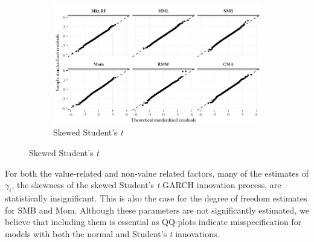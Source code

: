 \begin{figure}[!pt]
\begin{subfigure}{0.70\textwidth}
    \includegraphics[width=\textwidth]{graphics/qq_ghst.png}
    \caption{Skewed Student's \textit{t}}
  \end{subfigure}

  \label{fig:garch_qq}
\end{figure}



For both the value-related and non-value related factors, many of the estimates of $\gamma_i$, the skewness of the skewed Student's \textit{t} GARCH innovation process, are statistically insignificant. This is also the case for the degree of freedom estimates for SMB and Mom. Although these parameters are not significantly estimated, we believe that including them is essential as QQ-plots indicate misspecification for models with both the normal and Student's \textit{t} innovations.

